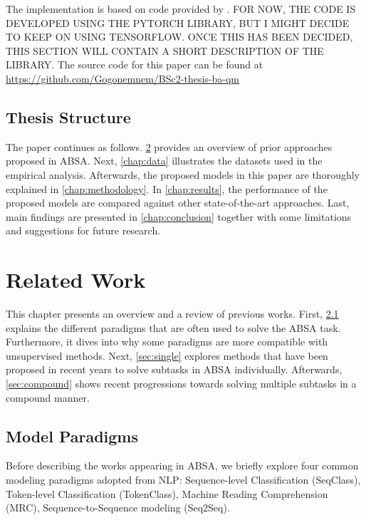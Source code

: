 \documentclass[american, oneside]{ecsgdp}
\begin{document}
The implementation is based on code provided by \textcite{Kumar2021CASC}. FOR NOW, THE CODE IS DEVELOPED USING THE PYTORCH LIBRARY, BUT I MIGHT DECIDE TO KEEP ON USING TENSORFLOW. ONCE THIS HAS BEEN DECIDED, THIS SECTION WILL CONTAIN A SHORT DESCRIPTION OF THE LIBRARY. The source code for this paper can be found at \url{https://github.com/Gogonemnem/BSc2-thesis-ba-qm}

\section{Thesis Structure} \label{sec:structure}
The paper continues as follows. \cref{chap:related_work} provides an overview of prior approaches proposed in ABSA. Next, \cref{chap:data} illustrates the datasets used in the empirical analysis. Afterwards, the proposed models in this paper are thoroughly explained in \cref{chap:methodology}. In \cref{chap:results}, the performance of the proposed models are compared against other state-of-the-art approaches. Last, main findings are presented in \cref{chap:conclusion} together with some limitations and suggestions for future research.

\chapter{Related Work} \label{chap:related_work}
This chapter presents an overview and a review of previous works. First, \cref{sec:paradigms} explains the different paradigms that are often used to solve the ABSA task. Furthermore, it dives into why some paradigms are more compatible with unsupervised methods. Next, \cref{sec:single} explores methods that have been proposed in recent years to solve subtasks in ABSA individually. Afterwards, \cref{sec:compound} shows recent progressions towards solving multiple subtasks in a compound manner. 

\section{Model Paradigms} \label{sec:paradigms}
Before describing the works appearing in ABSA, we briefly explore four common modeling paradigms adopted from NLP: Sequence-level Classification (SeqClass), Token-level Classification (TokenClass), Machine Reading Comprehension (MRC), Sequence-to-Sequence modeling (Seq2Seq).
\end{document}
